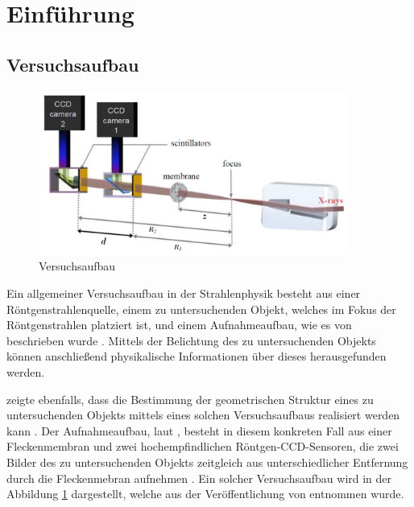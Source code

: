 \section{Einführung}

\subsection{Versuchsaufbau}

\begin{figure}[h!]
	\begin{center}
		\includegraphics[width=0.9\textwidth]{img/Versuchsaufbau}
		\caption[Versuchsaufbau]{Versuchsaufbau }
		\label{fig:versuch}
	\end{center}
\end{figure}

Ein allgemeiner Versuchsaufbau in der Strahlenphysik besteht aus einer Röntgenstrahlenquelle, einem zu untersuchenden Objekt, welches im Fokus der Röntgenstrahlen platziert ist, und einem Aufnahmeaufbau, wie es von \citeauthor{Ber13} beschrieben wurde . Mittels der Belichtung des zu untersuchenden Objekts können anschließend physikalische Informationen über dieses herausgefunden werden.

\citeauthor{Ber13} zeigte ebenfalls, dass die Bestimmung der geometrischen Struktur eines zu untersuchenden Objekts mittels eines solchen Versuchsaufbaus realisiert werden kann . Der Aufnahmeaufbau, laut \citeauthor{Ber15}, besteht in diesem konkreten Fall aus einer Fleckenmembran und zwei hochempfindlichen Röntgen-\gls{CCD}-Sensoren, die zwei Bilder des zu untersuchenden Objekts zeitgleich aus unterschiedlicher Entfernung durch die Fleckenmebran aufnehmen . Ein solcher Versuchsaufbau wird in der Abbildung \ref{fig:versuch} dargestellt, welche aus der Veröffentlichung \cite{Ber15} von \citeauthor{Ber15} entnommen wurde.

